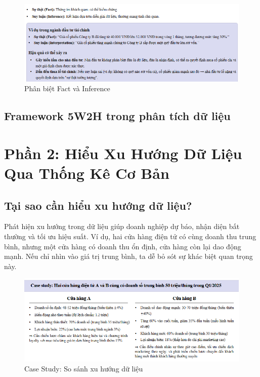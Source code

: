 \documentclass[11pt]{article}
\begin{document}
\begin{figure}[H]
    \centering
    \includegraphics[width=1\linewidth]{images/fact_vs_inference.png}
    \caption{Phân biệt Fact và Inference}
    \label{fig:fact_vs_inference}
\end{figure}

\subsection{Framework 5W2H trong phân tích dữ liệu}
\section{Phần 2: Hiểu Xu Hướng Dữ Liệu Qua Thống Kê Cơ Bản}

\subsection{Tại sao cần hiểu xu hướng dữ liệu?}
Phát hiện xu hướng trong dữ liệu giúp doanh nghiệp dự báo, nhận diện bất thường và tối ưu hiệu suất. Ví dụ, hai cửa hàng điện tử có cùng doanh thu trung bình, nhưng một cửa hàng có doanh thu ổn định, cửa hàng còn lại dao động mạnh. Nếu chỉ nhìn vào giá trị trung bình, ta dễ bỏ sót sự khác biệt quan trọng này.

\begin{figure}[H]
    \centering
    \includegraphics[width=1\linewidth]{images/caseStudy_DataTrending.png}
    \caption{Case Study: So sánh xu hướng dữ liệu}
    \label{fig:Case Study}
\end{figure}
\end{document}
